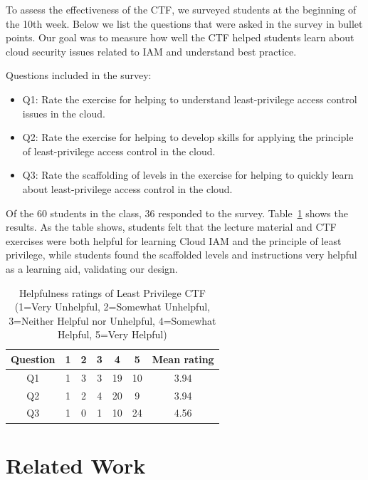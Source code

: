 \documentclass[a4paper,twoside]{article}
\begin{document}
To assess the effectiveness of the CTF, we surveyed students at the beginning of the 10th week. Below we list the questions that were asked in the survey in bullet points.  Our goal was to measure how well the CTF helped students learn about cloud security issues related to IAM and understand best practice.  

Questions included in the survey:
\begin{itemize}
\item Q1: Rate the exercise for helping to understand least-privilege access control issues in the cloud.
\item Q2: Rate the exercise for helping to develop skills for applying the principle of least-privilege access control in the cloud.
\item Q3: Rate the scaffolding of levels in the exercise for helping to quickly learn about least-privilege access control in the cloud.
\end{itemize}

Of the 60 students in the class, 36 responded to the survey.  Table~\ref{table:data} shows the results. As the table shows, students felt that the lecture material and CTF exercises were both helpful for learning Cloud IAM and the principle of least privilege, while students found the scaffolded levels and instructions very helpful as a learning aid, validating our design.

\begin{table}[h]
 \vspace{-0.20cm}
 \caption{Helpfulness ratings of Least Privilege CTF (1=Very Unhelpful, 2=Somewhat Unhelpful, 3=Neither Helpful nor Unhelpful, 4=Somewhat Helpful, 5=Very Helpful)}
    \label{table:data} \centering
    \begin{tabular}{|c|c|c|c|c|c|c|}
    \hline
    Question & 1 & 2 & 3 & 4 & 5 &Mean rating\\
    \hline
    \hline
    Q1 & 1 & 3 & 3 & 19 & 10 & 3.94\\ %
    \hline
    Q2 & 1 & 2 & 4 & 20 & 9 & 3.94\\ %
    \hline
    Q3 & 1 & 0 & 1 & 10 & 24 & 4.56\\ %
    \hline
    \end{tabular}
\end{table}



\section{Related Work}
\end{document}
